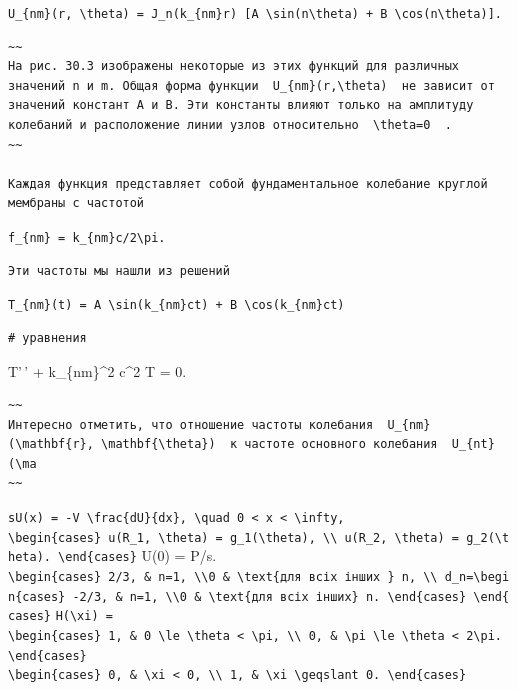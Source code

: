 \documentclass[
  ukrainian,
]{article}
\begin{document}
\texttt{U\_\{nm\}(r,\ \textbackslash{}theta)\ =\ J\_n(k\_\{nm\}r)\ {[}A\ \textbackslash{}sin(n\textbackslash{}theta)\ +\ B\ \textbackslash{}cos(n\textbackslash{}theta){]}.}

\begin{verbatim}
~~
На рис. 30.3 изображены некоторые из этих функций для различных значений n и m. Общая форма функции  U_{nm}(r,\theta)  не зависит от значений констант A и B. Эти константы влияют только на амплитуду колебаний и расположение линии узлов относительно  \theta=0  .
~~

Каждая функция представляет собой фундаментальное колебание круглой мембраны с частотой
\end{verbatim}

\texttt{f\_\{nm\}\ =\ k\_\{nm\}c/2\textbackslash{}pi.}

\begin{verbatim}
Эти частоты мы нашли из решений
\end{verbatim}

\texttt{T\_\{nm\}(t)\ =\ A\ \textbackslash{}sin(k\_\{nm\}ct)\ +\ B\ \textbackslash{}cos(k\_\{nm\}ct)}

\begin{verbatim}
# уравнения
\end{verbatim}

T'\,' + k\_\{nm\}\^{}2 c\^{}2 T = 0.

\begin{verbatim}
~~
Интересно отметить, что отношение частоты колебания  U_{nm}(\mathbf{r}, \mathbf{\theta})  к частоте основного колебания  U_{nt}(\ma
~~
\end{verbatim}

\texttt{sU(x)\ =\ -V\ \textbackslash{}frac\{dU\}\{dx\},\ \textbackslash{}quad\ 0\ \textless{}\ x\ \textless{}\ \textbackslash{}infty,}
\texttt{\textbackslash{}begin\{cases\}\ u(R\_1,\ \textbackslash{}theta)\ =\ g\_1(\textbackslash{}theta),\ \textbackslash{}\textbackslash{}\ u(R\_2,\ \textbackslash{}theta)\ =\ g\_2(\textbackslash{}theta).\ \textbackslash{}end\{cases\}}
U(0) = P/s.
\texttt{\textbackslash{}begin\{cases\}\ 2/3,\ \&\ n=1,\ \textbackslash{}\textbackslash{}0\ \&\ \textbackslash{}text\{для\ всіх\ інших\ \}\ n,\ \textbackslash{}\textbackslash{}\ d\_n=\textbackslash{}begin\{cases\}\ -2/3,\ \&\ n=1,\ \textbackslash{}\textbackslash{}0\ \&\ \textbackslash{}text\{для\ всіх\ інших\}\ n.\ \textbackslash{}end\{cases\}\ \textbackslash{}end\{cases\}}
\texttt{H(\textbackslash{}xi)\ =}
\texttt{\textbackslash{}begin\{cases\}\ 1,\ \&\ 0\ \textbackslash{}le\ \textbackslash{}theta\ \textless{}\ \textbackslash{}pi,\ \textbackslash{}\textbackslash{}\ 0,\ \&\ \textbackslash{}pi\ \textbackslash{}le\ \textbackslash{}theta\ \textless{}\ 2\textbackslash{}pi.\ \textbackslash{}end\{cases\}}
\texttt{\textbackslash{}begin\{cases\}\ 0,\ \&\ \textbackslash{}xi\ \textless{}\ 0,\ \textbackslash{}\textbackslash{}\ 1,\ \&\ \textbackslash{}xi\ \textbackslash{}geqslant\ 0.\ \textbackslash{}end\{cases\}}
\end{document}
